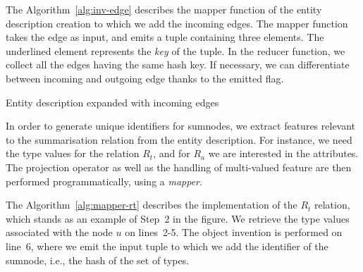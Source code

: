 The Algorithm~\ref{alg:inv-edge} describes the mapper function of the entity description creation to which we add the incoming edges. The mapper function takes the edge as input, and emits a tuple containing three elements. The underlined element represents the \emph{key} of the tuple. In the reducer function, we collect all the edges having the same hash key. If necessary, we can differentiate between incoming and outgoing edge thanks to the emitted flag.

\begin{algorithm}
	\DontPrintSemicolon
	\BlankLine
	\caption{Entity description expanded with incoming edges}
	\label{alg:inv-edge}
\end{algorithm}


In order to generate unique identifiers for sumnodes, we extract features relevant to the summarisation relation from the entity description. For instance, we need the type values for the relation $R_t$, and for $R_a$ we are interested in the attributes. The projection operator as well as the handling of multi-valued feature are then performed programmatically, using a \emph{mapper}.

The Algorithm~\ref{alg:mapper-rt} describes the implementation of the $R_t$ relation, which stands as an example of Step~2 in the figure. We retrieve the type values associated with the node $u$ on lines~2-5. The object invention is performed on line~6, where we emit the input tuple to which we add the identifier of the sumnode, i.e., the hash of the set of types.

